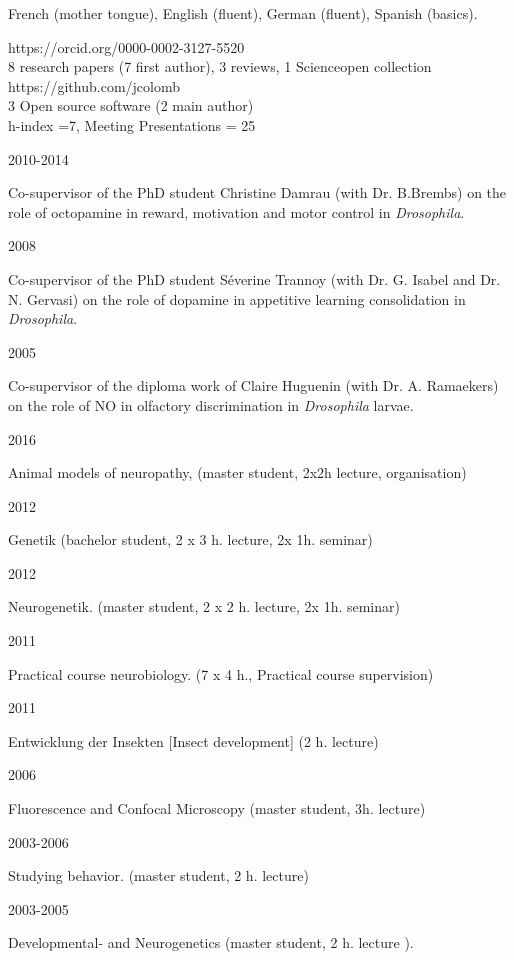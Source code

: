  French (mother tongue), English (fluent),
German (fluent), Spanish (basics).

%
 https://orcid.org/0000-0002-3127-5520\\
  8 research papers (7 first author), 3 reviews, 1 Scienceopen collection\\
 https://github.com/jcolomb\\
 3 Open source software (2 main author)\\
h-index =7,
Meeting Presentations = 25




\parbox{0.15\textwidth}{2010-2014}\hfill
	\parbox[t]{0.83\textwidth}{Co-supervisor of the PhD student Christine Damrau
(with Dr. B.Brembs) on the role of octopamine in reward, motivation and motor control in  \textit{Drosophila}.}
\parbox{0.15\textwidth}{2008}\hfill
	\parbox[t]{0.83\textwidth}{Co-supervisor of the PhD student S\'everine Trannoy
(with Dr. G. Isabel and Dr. N. Gervasi) on the role of dopamine in appetitive learning consolidation in  \textit{Drosophila}.}
\parbox{0.15\textwidth}{2005}\hfill
\parbox[t]{0.83\textwidth}{Co-supervisor of the diploma work of Claire Huguenin
(with Dr. A. Ramaekers) on the role of NO in olfactory discrimination in \textit{Drosophila} larvae.}





\parbox{0.15\textwidth}{2016}\hfill
\parbox[t]{0.83\textwidth}{Animal models of neuropathy, (master student, 2x2h lecture, organisation)}
%
\parbox{0.15\textwidth}{2012}\hfill
\parbox[t]{0.83\textwidth}{Genetik (bachelor student, 2 x 3 h. lecture, 2x 1h. seminar)}
\parbox{0.15\textwidth}{2012}\hfill
\parbox[t]{0.83\textwidth}{Neurogenetik. (master student, 2 x 2 h. lecture, 2x 1h. seminar)}
\parbox{0.15\textwidth}{2011}\hfill
\parbox[t]{0.83\textwidth}{Practical course neurobiology. (7 x 4 h., Practical course supervision)}
\parbox{0.15\textwidth}{2011}\hfill
\parbox[t]{0.83\textwidth}{Entwicklung der Insekten [Insect development] (2 h. lecture)}
\parbox{0.15\textwidth}{2006}\hfill
\parbox[t]{0.83\textwidth}{Fluorescence and Confocal Microscopy (master student, 3h. lecture)}
\parbox{0.15\textwidth}{2003-2006}\hfill
\parbox[t]{0.83\textwidth}{Studying behavior. (master student, 2 h. lecture)}
\parbox{0.15\textwidth}{2003-2005}\hfill
\parbox[t]{0.83\textwidth}{Developmental- and Neurogenetics %
(master student, 2 h. lecture%
).}


